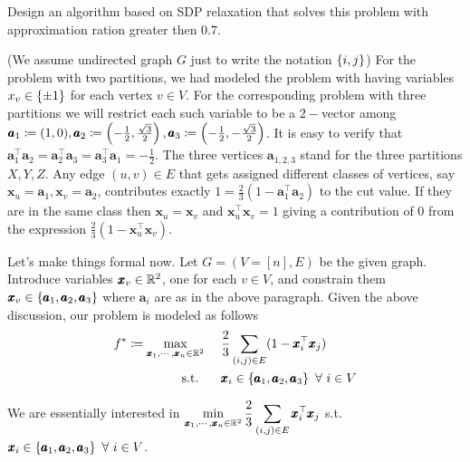 Design an algorithm based on SDP relaxation that solves this problem with approximation ration greater then $0.7$.

\soln

(We assume undirected graph $G$ just to write the notation $\left\{i,j\right\}$)
For the problem with two partitions, we had modeled the problem with having variables $x_{v}\in \left\{\pm 1\right\}$ for each vertex $v\in V$. For the corresponding problem with three partitions we will restrict each such variable to be a $2-$vector among $\pmb a_{1} \coloneqq (1,0), \pmb a_{2} \coloneqq\left(-\frac12,\frac{\sqrt3}{2}\right), \pmb a_{3} \coloneqq \left(-\frac12,-\frac{\sqrt3}{2}\right)$. It is easy to verify that $\pmb a_{1}^{\top}\pmb a_{2} = \pmb a_{2}^{\top}\pmb a_{3} = \pmb a_{3}^{\top}\pmb a_{1} = -\frac12$. The three vertices $\pmb a_{1,2,3}$ stand for the three partitions $X,Y,Z$. Any edge $(u,v)\in E$ that gets assigned different classes of vertices, say $\pmb x_{u} = \pmb a_{1}, \pmb x_{v} = \pmb a_{2}$, contributes exactly $1 = \frac{2}{3}\left(1-\pmb a_{1}^{\top}\pmb a_{2}\right)$ to the cut value. If they are in the same class then $\pmb x_{u} = \pmb x_{v}$ and $\pmb x_{u}^{\top}\pmb x_{v} = 1$ giving a contribution of $0$ from the expression $\frac{2}{3}\left(1-\pmb x_{u}^{\top}\pmb x_{v}\right)$.

Let's make things formal now. Let $G=(V=[n],E)$ be the given graph. Introduce variables $\pmb x_{v}\in \mathbb{R}^{2}$, one for each $v\in V$, and constrain them $\pmb x_{v}\in \left\{\pmb a_{1},\pmb a_{2}, \pmb a_{3}\right\}$ where $\pmb a_{i}$ are as in the above paragraph. Given the above discussion, our problem is modeled as follows
\begin{equation}\label{max3cut}\begin{aligned}
f^{*}\coloneqq \max_{\pmb x_{1},\cdots, \pmb x_{n}\in \mathbb{R}^{2}} &~~~~\frac{2}{3} \sum_{(i,j)\in E} (1-\pmb x_{i}^{\top}\pmb x_{j})\\
\text{s.t. } &~~~~ \pmb x_{i}\in \left\{\pmb a_{1},\pmb a_{2}, \pmb a_{3}\right\} ~\forall~ i\in V
\end{aligned}\end{equation}

We are essentially interested in $\displaystyle\min_{\pmb x_{1},\cdots, \pmb x_{n}\in \mathbb{R}^{2}}\frac{2}{3} \sum_{(i,j)\in E} \pmb x_{i}^{\top}\pmb x_{j}$ s.t. $\pmb x_{i}\in \left\{\pmb a_{1},\pmb a_{2}, \pmb a_{3}\right\} ~\forall~ i\in V$.

